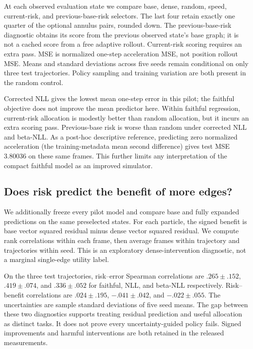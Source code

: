 At each observed evaluation state we compare base, dense, random, speed, current-risk, and previous-base-risk selectors. The last four retain exactly one quarter of the optional annulus pairs, rounded down. The previous-base-risk diagnostic obtains its score from the previous observed state's base graph; it is not a cached score from a free adaptive rollout. Current-risk scoring requires an extra pass. MSE is normalized one-step acceleration MSE, not position rollout MSE. Means and standard deviations across five seeds remain conditional on only three test trajectories. Policy sampling and training variation are both present in the random control.


Corrected NLL gives the lowest mean one-step error in this pilot; the faithful objective does not improve the mean predictor here. Within faithful regression, current-risk allocation is modestly better than random allocation, but it incurs an extra scoring pass. Previous-base risk is worse than random under corrected NLL and beta-NLL. As a post-hoc descriptive reference, predicting zero normalized acceleration (the training-metadata mean second difference) gives test MSE 3.80036 on these same frames. This further limits any interpretation of the compact faithful model as an improved simulator.

\subsection{Does risk predict the benefit of more edges?}
We additionally freeze every pilot model and compare base and fully expanded predictions on the same preselected states. For each particle, the signed benefit is base vector squared residual minus dense vector squared residual. We compute rank correlations within each frame, then average frames within trajectory and trajectories within seed. This is an exploratory dense-intervention diagnostic, not a marginal single-edge utility label.

On the three test trajectories, risk--error Spearman correlations are $.265\pm.152$, $.419\pm.074$, and $.336\pm.052$ for faithful, NLL, and beta-NLL respectively. Risk--benefit correlations are $.024\pm.195$, $-.041\pm.042$, and $-.022\pm.055$. The uncertainties are sample standard deviations of five seed means. The gap between these two diagnostics supports treating residual prediction and useful allocation as distinct tasks. It does not prove every uncertainty-guided policy fails. Signed improvements and harmful interventions are both retained in the released measurements.

